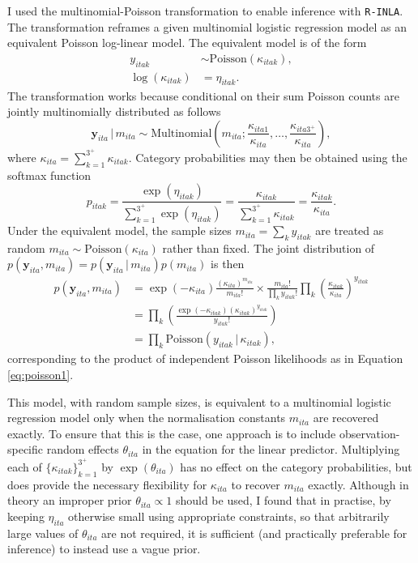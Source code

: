 \documentclass[a4paper, nobind]{templates/ociamthesis}
\begin{document}
I used the multinomial-Poisson transformation to enable inference with \texttt{R-INLA}.
The transformation reframes a given multinomial logistic regression model as an equivalent Poisson log-linear model.
The equivalent model is of the form
\begin{align}
    y_{itak} &\sim \text{Poisson}(\kappa_{itak}), \label{eq:poisson1} \\
    \log(\kappa_{itak}) &= \eta_{itak}. \label{eq:poisson2}
\end{align}
The transformation works because conditional on their sum Poisson counts are jointly multinomially distributed \autocite{mccullagh1989generalized} as follows
\begin{equation}
    \mathbf{y}_{ita} \, | \, m_{ita} \sim \text{Multinomial} \left( m_{ita}; \frac{\kappa_{ita1}}{\kappa_{ita}}, \ldots, \frac{\kappa_{ita3^{+}}}{\kappa_{ita}} \right),
\end{equation}
where \(\kappa_{ita} = \sum_{k = 1}^{3^{+}} \kappa_{itak}\).
Category probabilities may then be obtained using the softmax function
\begin{equation}
    p_{itak} = \frac{\exp(\eta_{itak})}{\sum_{k = 1}^{3^{+}} \exp(\eta_{itak})} = \frac{\kappa_{itak}}{\sum_{k = 1}^{3^{+}} \kappa_{itak}} = \frac{\kappa_{itak}}{\kappa_{ita}}.
\end{equation}
Under the equivalent model, the sample sizes \(m_{ita} = \sum_k y_{itak}\) are treated as random \(m_{ita} \sim \text{Poisson} \left( \kappa_{ita} \right)\) rather than fixed.
The joint distribution of \(p(\mathbf{y}_{ita}, m_{ita}) = p(\mathbf{y}_{ita} \, | \, m_{ita})p(m_{ita})\) is then
\begin{align}
p(\mathbf{y}_{ita}, m_{ita}) &= \exp(-\kappa_{ita}) \frac{(\kappa_{ita})^{m_{ita}}}{m_{ita}!} \times \frac{m_{ita}!}{\prod_k y_{itak}!} \prod_k \left( \frac{\kappa_{itak}}{\kappa_{ita}} \right)^{y_{itak}} \\
&= \prod_k \left( \frac{\exp(-\kappa_{itak}) \left( \kappa_{itak} \right)^{y_{itak}}}{y_{itak}!} \right) \\
&= \prod_k \text{Poisson} \left( y_{itak} \, | \, \kappa_{itak} \right), \label{eq:prodpoisson}
\end{align}
corresponding to the product of independent Poisson likelihoods as in Equation \eqref{eq:poisson1}.

This model, with random sample sizes, is equivalent to a multinomial logistic regression model only when the normalisation constants \(m_{ita}\) are recovered exactly.
To ensure that this is the case, one approach is to include observation-specific random effects \(\theta_{ita}\) in the equation for the linear predictor.
Multiplying each of \(\{\kappa_{itak}\}_{k = 1}^{3^+}\) by \(\exp(\theta_{ita})\) has no effect on the category probabilities, but does provide the necessary flexibility for \(\kappa_{ita}\) to recover \(m_{ita}\) exactly.
Although in theory an improper prior \(\theta_{ita} \propto 1\) should be used, I found that in practise, by keeping \(\eta_{ita}\) otherwise small using appropriate constraints, so that arbitrarily large values of \(\theta_{ita}\) are not required, it is sufficient (and practically preferable for inference) to instead use a vague prior.
\end{document}
